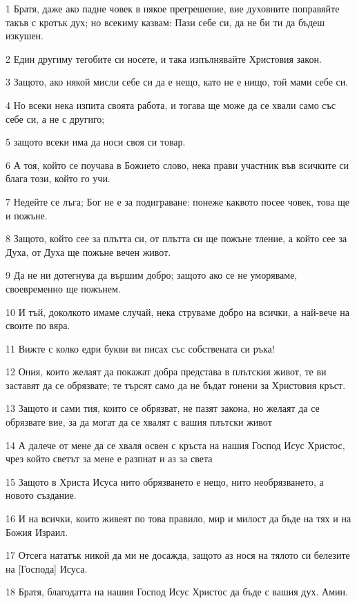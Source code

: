 \par 1 Братя, даже ако падне човек в някое прегрешение, вие духовните поправяйте такъв с кротък дух; но всекиму казвам: Пази себе си, да не би ти да бъдеш изкушен.
\par 2 Един другиму тегобите си носете, и така изпълнявайте Христовия закон.
\par 3 Защото, ако някой мисли себе си да е нещо, като не е нищо, той мами себе си.
\par 4 Но всеки нека изпита своята работа, и тогава ще може да се хвали само със себе си, а не с другиго;
\par 5 защото всеки има да носи своя си товар.
\par 6 А тоя, който се поучава в Божието слово, нека прави участник във всичките си блага този, който го учи.
\par 7 Недейте се лъга; Бог не е за подиграване: понеже каквото посее човек, това ще и пожъне.
\par 8 Защото, който сее за плътта си, от плътта си ще пожъне тление, а който сее за Духа, от Духа ще пожъне вечен живот.
\par 9 Да не ни дотегнува да вършим добро; защото ако се не уморяваме, своевременно ще пожънем.
\par 10 И тъй, доколкото имаме случай, нека струваме добро на всички, а най-вече на своите по вяра.
\par 11 Вижте с колко едри букви ви писах със собствената си ръка!
\par 12 Ония, които желаят да покажат добра представа в плътския живот, те ви заставят да се обрязвате; те търсят само да не бъдат гонени за Христовия кръст.
\par 13 Защото и сами тия, които се обрязват, не пазят закона, но желаят да се обрязвате вие, за да могат да се хвалят с вашия плътски живот
\par 14 А далече от мене да се хваля освен с кръста на нашия Господ Исус Христос, чрез който светът за мене е разпнат и аз за света
\par 15 Защото в Христа Исуса нито обрязването е нещо, нито необрязването, а новото създание.
\par 16 И на всички, които живеят по това правило, мир и милост да бъде на тях и на Божия Израил.
\par 17 Отсега нататък никой да ми не досажда, защото аз нося на тялото си белезите на [Господа] Исуса.
\par 18 Братя, благодатта на нашия Господ Исус Христос да бъде с вашия дух. Амин.

